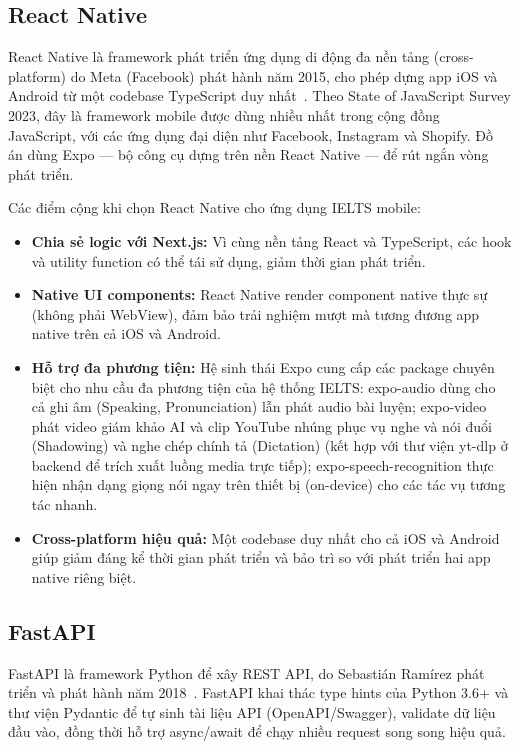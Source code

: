 \subsection{React Native}

React Native là framework phát triển ứng dụng di động đa nền tảng (cross-platform) do Meta (Facebook) phát hành năm 2015, cho phép dựng app iOS và Android từ một codebase TypeScript duy nhất~\cite{reactnative-docs}. Theo State of JavaScript Survey 2023, đây là framework mobile được dùng nhiều nhất trong cộng đồng JavaScript, với các ứng dụng đại diện như Facebook, Instagram và Shopify. Đồ án dùng Expo --- bộ công cụ dựng trên nền React Native --- để rút ngắn vòng phát triển.

Các điểm cộng khi chọn React Native cho ứng dụng IELTS mobile:

\begin{itemize}
    \item \textbf{Chia sẻ logic với Next.js:} Vì cùng nền tảng React và TypeScript, các hook và utility function có thể tái sử dụng, giảm thời gian phát triển.
    \item \textbf{Native UI components:} React Native render component native thực sự (không phải WebView), đảm bảo trải nghiệm mượt mà tương đương app native trên cả iOS và Android.
    \item \textbf{Hỗ trợ đa phương tiện:} Hệ sinh thái Expo cung cấp các package chuyên biệt cho nhu cầu đa phương tiện của hệ thống IELTS: expo-audio dùng cho cả ghi âm (Speaking, Pronunciation) lẫn phát audio bài luyện; expo-video phát video giám khảo AI và clip YouTube nhúng phục vụ nghe và nói đuổi (Shadowing) và nghe chép chính tả (Dictation) (kết hợp với thư viện yt-dlp ở backend để trích xuất luồng media trực tiếp); expo-speech-recognition thực hiện nhận dạng giọng nói ngay trên thiết bị (on-device) cho các tác vụ tương tác nhanh.
    \item \textbf{Cross-platform hiệu quả:} Một codebase duy nhất cho cả iOS và Android giúp giảm đáng kể thời gian phát triển và bảo trì so với phát triển hai app native riêng biệt.
\end{itemize}

\subsection{FastAPI}

FastAPI là framework Python để xây REST API, do Sebastián Ramírez phát triển và phát hành năm 2018~\cite{fastapi-docs}. FastAPI khai thác type hints của Python 3.6+ và thư viện Pydantic để tự sinh tài liệu API (OpenAPI/Swagger), validate dữ liệu đầu vào, đồng thời hỗ trợ async/await để chạy nhiều request song song hiệu quả.

